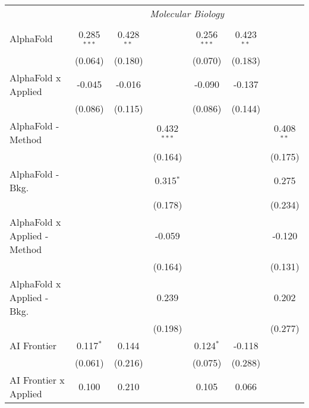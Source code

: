 \begin{tabular}{lcccccc}
 & \multicolumn{6}{c}{\textit{Molecular Biology}} \\ \\
   AlphaFold                      & 0.285$^{***}$ & 0.428$^{**}$ &               & 0.256$^{***}$ & 0.423$^{**}$ &   \\   
                                  & (0.064)       & (0.180)      &               & (0.070)       & (0.183)      &   \\   
   AlphaFold x Applied            & -0.045        & -0.016       &               & -0.090        & -0.137       &   \\   
                                  & (0.086)       & (0.115)      &               & (0.086)       & (0.144)      &   \\   
   AlphaFold - Method             &               &              & 0.432$^{***}$ &               &              & 0.408$^{**}$\\   
                                  &               &              & (0.164)       &               &              & (0.175)\\   
   AlphaFold - Bkg.               &               &              & 0.315$^{*}$   &               &              & 0.275\\   
                                  &               &              & (0.178)       &               &              & (0.234)\\   
   AlphaFold x Applied - Method   &               &              & -0.059        &               &              & -0.120\\   
                                  &               &              & (0.164)       &               &              & (0.131)\\   
   AlphaFold x Applied - Bkg.     &               &              & 0.239         &               &              & 0.202\\   
                                  &               &              & (0.198)       &               &              & (0.277)\\   
   AI Frontier                    & 0.117$^{*}$   & 0.144        &               & 0.124$^{*}$   & -0.118       &   \\   
                                  & (0.061)       & (0.216)      &               & (0.075)       & (0.288)      &   \\   
   AI Frontier x Applied          & 0.100         & 0.210        &               & 0.105         & 0.066        &   \\   

\end{tabular}
